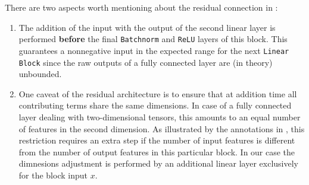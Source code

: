 There are two aspects worth mentioning about the residual connection in :
\begin{enumerate}
  \item The addition of the input with the output of the second linear layer is performed \textbf{before} the final \texttt{Batchnorm} and \texttt{ReLU} layers of this block.
        This guarantees a nonnegative input in the expected range for the next \texttt{Linear Block} since the raw outputs of a fully connected layer are (in theory) unbounded.

  \item One caveat of the residual architecture is to ensure that at addition time all contributing terms share the same dimensions.
        In case of a fully connected layer dealing with two-dimensional tensors, this amounts to an equal number of features in the second dimension.
        As illustrated by the annotations in , this restriction requires an extra step if the number of input features is different from the number of output features in this particular block.
        In our case the dimnesions adjustment is performed by an additional linear layer exclusively for the block input $x$.
\end{enumerate}

